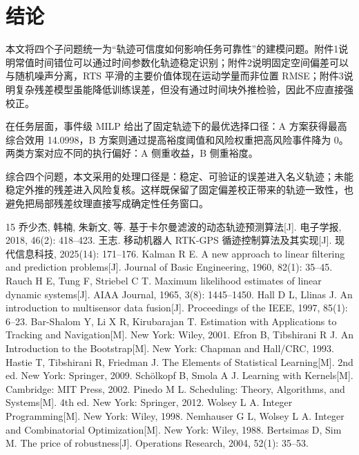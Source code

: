 \documentclass{cumcmthesis}
\begin{document}
\section{结论}
本文将四个子问题统一为“轨迹可信度如何影响任务可靠性”的建模问题。附件1说明常值时间错位可以通过时间参数化轨迹稳定识别；附件2说明固定空间偏差可以与随机噪声分离，RTS 平滑的主要价值体现在运动学量而非位置 RMSE；附件3说明复杂残差模型虽能降低训练误差，但没有通过时间块外推检验，因此不应直接强校正。

在任务层面，事件级 MILP 给出了固定轨迹下的最优选择口径：A 方案获得最高综合效用 14.0998，B 方案则通过提高裕度阈值和风险权重把高风险事件降为 0。两类方案对应不同的执行偏好：A 侧重收益，B 侧重裕度。

综合四个问题，本文采用的处理口径是：稳定、可验证的误差进入名义轨迹；未能稳定外推的残差进入风险复核。这样既保留了固定偏差校正带来的轨迹一致性，也避免把局部残差纹理直接写成确定性任务窗口。

\clearpage
\begin{thebibliography}{15}
 乔少杰, 韩楠, 朱新文, 等. 基于卡尔曼滤波的动态轨迹预测算法[J]. 电子学报, 2018, 46(2): 418--423.
 王志. 移动机器人 RTK-GPS 循迹控制算法及其实现[J]. 现代信息科技, 2025(14): 171--176.
 Kalman R E. A new approach to linear filtering and prediction problems[J]. Journal of Basic Engineering, 1960, 82(1): 35--45.
 Rauch H E, Tung F, Striebel C T. Maximum likelihood estimates of linear dynamic systems[J]. AIAA Journal, 1965, 3(8): 1445--1450.
 Hall D L, Llinas J. An introduction to multisensor data fusion[J]. Proceedings of the IEEE, 1997, 85(1): 6--23.
 Bar-Shalom Y, Li X R, Kirubarajan T. Estimation with Applications to Tracking and Navigation[M]. New York: Wiley, 2001.
 Efron B, Tibshirani R J. An Introduction to the Bootstrap[M]. New York: Chapman and Hall/CRC, 1993.
 Hastie T, Tibshirani R, Friedman J. The Elements of Statistical Learning[M]. 2nd ed. New York: Springer, 2009.
 Schölkopf B, Smola A J. Learning with Kernels[M]. Cambridge: MIT Press, 2002.
 Pinedo M L. Scheduling: Theory, Algorithms, and Systems[M]. 4th ed. New York: Springer, 2012.
 Wolsey L A. Integer Programming[M]. New York: Wiley, 1998.
 Nemhauser G L, Wolsey L A. Integer and Combinatorial Optimization[M]. New York: Wiley, 1988.
 Bertsimas D, Sim M. The price of robustness[J]. Operations Research, 2004, 52(1): 35--53.
\end{thebibliography}
\end{document}
